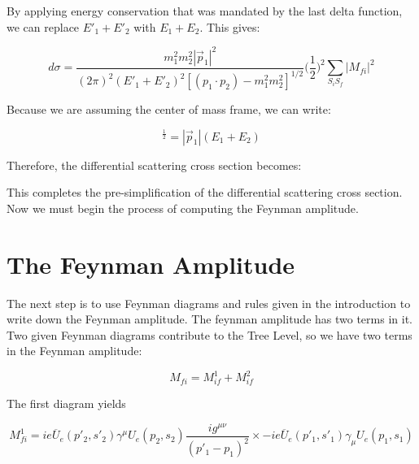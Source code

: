 \documentclass[a4]{article}
\begin{document}
    By applying energy conservation that was mandated by the last delta function, we can replace $E'_1 + E'_2$ with $E_1 + E_2$. This gives:

    \begin{equation}
        d \sigma = \frac{m_1^2 m_2^2 |\vec{p}_1|^2}{(2 \pi)^2 (E'_1 + E'_2)^2 [(p_1 \cdot p_2) - m_1^2 m_2^2]^{1/2}} \bigg( \frac{1}{2} \bigg)^2 \sum_{S_i S_f} |M_{fi}|^2
    \end{equation}

    Because we are assuming the center of mass frame, we can write:

    \begin{equation}
        [(p_1 \cdot p_2)^2 - m_1^2 m_2^2]^\frac{1}{2} = |\vec{p}_1| (E_1 + E_2)
    \end{equation}

    Therefore, the differential scattering cross section becomes:

    \begin{center}
    \end{center}

    This completes the pre-simplification of the differential scattering cross section. Now we must begin the process of computing the Feynman amplitude.

    \section*{The Feynman Amplitude}

    The next step is to use Feynman diagrams and rules given in the introduction to write down the Feynman amplitude. The feynman amplitude has two terms in it. Two given Feynman diagrams contribute to the
    Tree Level, so we have two terms in the Feynman amplitude:

    \begin{equation}
        M_{fi} = M_{if}^1 + M_{if}^2
    \end{equation}

    The first diagram yields

    \begin{equation}
        M_{fi}^1 = i e \overline{U}_e (p'_2, s'_2) \gamma^{\mu} U_e (p_2, s_2) \frac{i g^{\mu \nu}}{(p'_1 - p_1)^2} \times - i e \overline{U}_e (p'_1, s'_1) \gamma_{\mu} U_e (p_1, s_1)
    \end{equation}
\end{document}
